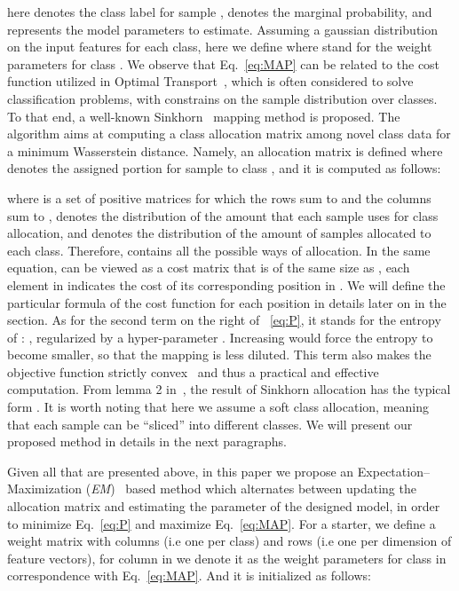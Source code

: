 \documentclass[review]{elsarticle}
\begin{document}
here  denotes the class label for sample ,  denotes the marginal probability, and  represents the model parameters to estimate. Assuming a gaussian distribution on the input features for each class, here we define  where  stand for the weight parameters for class . We observe that Eq.~\ref{eq:MAP} can be related to the cost function utilized in Optimal Transport~\cite{villani2008optimal}, which is often considered to solve classification problems, with constrains on the sample distribution over classes. To that end, a well-known  Sinkhorn~\cite{cuturi2013sinkhorn} mapping method is proposed. The algorithm aims at computing a class allocation matrix among novel class data for a minimum Wasserstein distance. Namely, an allocation matrix  is defined where  denotes the assigned portion for sample  to class , and it is computed as follows:

where  is a set of positive matrices for which the rows sum to  and the columns sum to ,  denotes the distribution of the amount that each sample uses for class allocation, and  denotes the distribution of the amount of samples allocated to each class. Therefore,  contains all the possible ways of allocation. In the same equation,  can be viewed as a cost matrix that is of the same size as , each element in  indicates the cost of its corresponding position in . We will define the particular formula of the cost function for each position  in details later on in the section. As for the second term on the right of ~\ref{eq:P}, it stands for the entropy of : , regularized by a hyper-parameter . Increasing  would force the entropy to become smaller, so that the mapping is less diluted. This term also makes the objective function strictly convex~\cite{cuturi2013sinkhorn, solomon2015convolutional} and thus a practical and effective computation. 
From lemma 2 in~\cite{cuturi2013sinkhorn}, the result of Sinkhorn allocation has the typical form . It is worth noting that here we assume a soft class allocation, meaning that each sample can be ``sliced'' into different classes. We will present our proposed method in details in the next paragraphs.

Given all that are presented above, in this paper we propose an Expectation–Maximization (\emph{EM})~\cite{dempster1977maximum} based method which alternates between updating the allocation matrix  and estimating the parameter  of the designed model, in order to minimize Eq.~\ref{eq:P} and maximize Eq.~\ref{eq:MAP}. For a starter, we define a weight matrix  with  columns (i.e one per class) and  rows (i.e one per dimension of feature vectors), for column  in  we denote it as the weight parameters  for class  in correspondence with Eq.~\ref{eq:MAP}. And it is initialized as follows:
\end{document}
